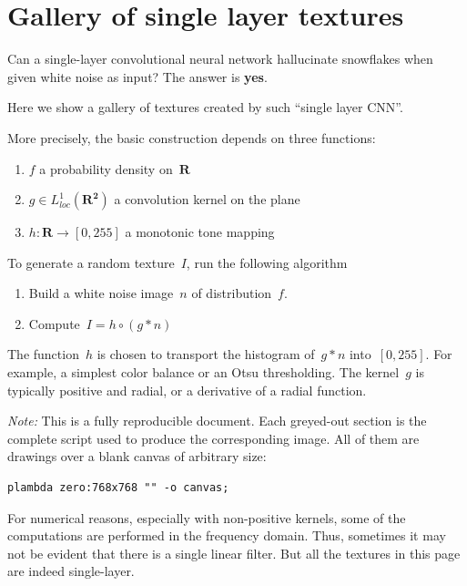 \section{Gallery of single layer textures}

Can a single-layer convolutional neural network hallucinate snowflakes when
given white noise as input?  The answer is {\bf yes}.

Here we show a gallery of textures created by such ``single layer CNN''.

More precisely,
the basic construction depends on three functions:
\begin{enumerate}
	\item $f$ a probability density on~$\mathbf{R}$
	\item $g\in L^1_{loc}(\mathbf{R^2})$ a convolution kernel on the plane
	\item $h:\mathbf{R}\to[0,255]$ a monotonic tone mapping
\end{enumerate}
To generate a random texture~$I$, run the following algorithm
\begin{enumerate}
	\item Build a white noise image~$n$ of distribution~$f$.
	\item Compute~$I=h\circ (g*n)$
\end{enumerate}
The function~$h$ is chosen to transport the histogram of~$g*n$
into~$[0,255]$.  For example, a simplest color balance or an Otsu
thresholding.  The kernel~$g$ is typically positive and radial, or a
derivative of a radial function.


\emph{Note:}
This is a fully reproducible document.
Each greyed-out section is the complete script used to produce the
corresponding image.  All of them are drawings over a blank canvas of
arbitrary size:

\begin{verbatim}
plambda zero:768x768 "" -o canvas;
\end{verbatim}

For numerical reasons, especially with non-positive kernels, some of the
computations are performed in the frequency domain.  Thus, sometimes it may
not be evident that there is a single linear filter.  But all the textures in
this page are indeed single-layer.

